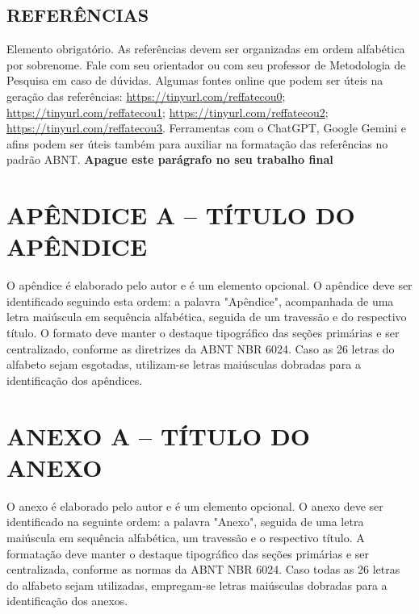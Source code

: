 \documentclass[
	article,
	12pt,
	oneside,
	a4paper,
	english,
	brazil,
	sumario=tradicional
]{abntex2}
\begin{document}
\postextual

\section*{\textbf{REFERÊNCIAS}}

Elemento obrigatório. As referências devem ser organizadas em ordem alfabética por sobrenome. Fale com seu orientador ou com seu professor de Metodologia de Pesquisa em caso de dúvidas. Algumas fontes online que podem ser úteis na geração das referências: \url{https://tinyurl.com/reffatecou0};  \url{https://tinyurl.com/reffatecou1}; \url{https://tinyurl.com/reffatecou2}; \url{https://tinyurl.com/reffatecou3}. Ferramentas com o ChatGPT, Google Gemini e afins podem ser úteis também para auxiliar na formatação das referências no padrão ABNT. \textbf{Apague este parágrafo no seu trabalho final}

\renewcommand{\bibname}{}



\renewcommand{\glossaryname}{\textbf{GLOSSÁRIO}}
\renewcommand{\glossarypreamble}{
	Elemento opcional. Deve ser elaborado em ordem alfabética.\\ \\
}


\printglossaries

\vspace{\onelineskip}
\vspace{\onelineskip}

\chapter*{\textbf{APÊNDICE A – TÍTULO DO APÊNDICE}}

O apêndice é elaborado pelo autor e é um elemento opcional. O apêndice deve ser identificado seguindo esta ordem: a palavra "Apêndice", acompanhada de uma letra maiúscula em sequência alfabética, seguida de um travessão e do respectivo título. O formato deve manter o destaque tipográfico das seções primárias e ser centralizado, conforme as diretrizes da ABNT NBR 6024. Caso as 26 letras do alfabeto sejam esgotadas, utilizam-se letras maiúsculas dobradas para a identificação dos apêndices.

\vspace{\onelineskip}


\chapter*{\textbf{ANEXO A – TÍTULO DO ANEXO}}

O anexo é elaborado pelo autor e é um elemento opcional. O anexo deve ser identificado na seguinte ordem: a palavra "Anexo", seguida de uma letra maiúscula em sequência alfabética, um travessão e o respectivo título. A formatação deve manter o destaque tipográfico das seções primárias e ser centralizada, conforme as normas da ABNT NBR 6024. Caso todas as 26 letras do alfabeto sejam utilizadas, empregam-se letras maiúsculas dobradas para a identificação dos anexos.
\end{document}
